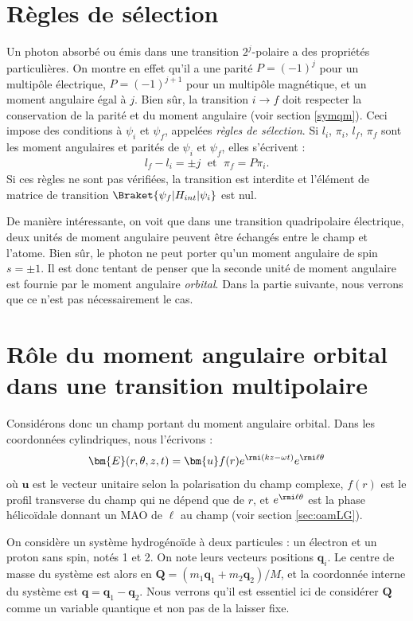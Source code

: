 \section{Règles de sélection}
Un photon absorbé ou émis dans une transition $2^j$-polaire a des propriétés particulières. On montre en effet  qu'il a une parité $P=(-1)^j$ pour un multipôle électrique, $P=(-1)^{j+1}$ pour un multipôle magnétique, et un moment angulaire égal à $j$. Bien sûr, la transition $i\rightarrow f$ doit respecter la conservation de la parité et du moment angulaire (voir section \ref{symqm}). Ceci impose des conditions à $\psi_i$ et $\psi_f$, appelées \textit{règles de sélection}. Si $l_i$, $\pi_i$, $l_f$, $\pi_f$ sont les moment angulaires et parités de $\psi_i$ et $\psi_f$, elles s'écrivent :
\begin{align}
l_f-l_i=\pm j\;\text{ et }\;\pi_f=P\pi_i.
\end{align}
Si ces règles ne sont pas vérifiées, la transition est interdite et l'élément de matrice de transition $\Braket{\psi_f|H_{int}|\psi_i}$ est nul.

De manière intéressante, on voit que dans une transition quadripolaire électrique, deux unités de moment angulaire peuvent être échangés entre le champ et l'atome. Bien sûr, le photon ne peut porter qu'un moment angulaire de spin $s=\pm 1$. Il est donc tentant de penser que la seconde unité de moment angulaire est fournie par le moment angulaire \textit{orbital}. Dans la partie suivante, nous verrons que ce n'est pas nécessairement le cas.

\section{Rôle du moment angulaire orbital dans une transition multipolaire}
Considérons donc un champ portant du moment angulaire orbital. Dans les coordonnées cylindriques, nous l'écrivons :
\[\bm{E}(r,\theta,z,t) = \bm{u} f(r)e^{\rmi(kz-\omega t)}e^{\rmi\ell\theta}\]
où $\bm{u}$ est le vecteur unitaire selon la polarisation du champ complexe, $f(r)$ est le profil transverse du champ qui ne dépend que de $r$, et $e^{\rmi\ell\theta}$ est la phase hélicoïdale donnant un MAO de $\ell$ au champ (voir section \ref{sec:oamLG}).

On considère un système hydrogénoïde à deux particules : un électron et un proton sans spin, notés 1 et 2. On note leurs vecteurs positions $\bm{q}_i$. Le centre de masse du système est alors en $\bm{Q} = (m_1 \bm{q}_1+m_2 \bm{q}_2)/M$, et la coordonnée interne du système est $\bm{q} = \bm{q}_1-\bm{q}_2$. Nous verrons qu'il est essentiel ici de considérer $\bm{Q}$ comme un variable quantique et non pas de la laisser fixe.

